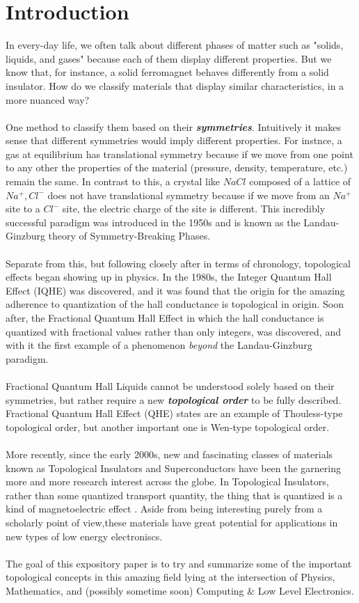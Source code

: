 \documentclass[11pt]{article}
\begin{document}
\section{Introduction}
In every-day life, we often talk about different phases of matter such as "solids, liquids, and gases" because each of them display different properties. But we know that, for instance, a solid ferromagnet behaves differently from a solid insulator. How do we classify materials that display similar characteristics, in a more nuanced way? 
\\
\\
One method to classify them based on their \textbf{\emph{symmetries}}. Intuitively it makes sense that different symmetries would imply different properties. For instnce, a gas at equilibrium has translational symmetry because if we move from one point to any other the properties of the material (pressure, density, temperature, etc.) remain the same. In contrast to this, a crystal like $NaCl$ composed of a lattice of $Na^+, Cl^-$ does not have translational symmetry because if we move from an $Na^+$ site to a $Cl^-$ site, the electric charge of the site is different. This incredibly successful paradigm was introduced in the 1950s and is known as the Landau-Ginzburg theory of Symmetry-Breaking Phases.
\\
\\
Separate from this, but following closely after in terms of chronology, topological effects began showing up in physics. In the 1980s, the Integer Quantum Hall Effect (IQHE) was discovered, and it was found that the origin for the amazing adherence to quantization of the hall conductance is topological in origin. Soon after, the Fractional Quantum Hall Effect in which the hall conductance is quantized with fractional values rather than only integers, was discovered, and with it the first example of a phenomenon \emph{beyond} the Landau-Ginzburg paradigm. 
\\
\\
Fractional Quantum Hall Liquids cannot be understood solely based on their symmetries, but rather require a new \textbf{\emph{topological order}} to be fully described. Fractional Quantum Hall Effect (QHE) states are an example of Thouless-type topological order, but another important one is Wen-type topological order. 
\\
\\
More recently, since the early 2000s, new and fascinating classes of materials known as Topological Insulators and Superconductors have been the garnering more and more research interest across the globe. In Topological Insulators, rather than some quantized transport quantity, the thing that is quantized is a kind of magnetoelectric effect \cite{MooreMoessner21}. Aside from being interesting purely from a scholarly point of view,these materials have great potential for applications in new types of low energy electroniscs. 
\\
\\
The goal of this expository paper is to try and summarize some of the important topological concepts in this amazing field lying at the intersection of Physics, Mathematics, and (possibly sometime soon) Computing \& Low Level Electronics.
\\
\end{document}
